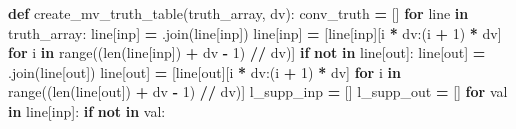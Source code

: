 \documentclass[
  italian,
]{book}
\newenvironment{Shaded}{\begin{snugshade}}{\end{snugshade}}
\newcommand{\BuiltInTok}[1]{#1}
\newcommand{\ControlFlowTok}[1]{\textcolor[rgb]{0.13,0.29,0.53}{\textbf{#1}}}
\newcommand{\DecValTok}[1]{\textcolor[rgb]{0.00,0.00,0.81}{#1}}
\newcommand{\KeywordTok}[1]{\textcolor[rgb]{0.13,0.29,0.53}{\textbf{#1}}}
\newcommand{\NormalTok}[1]{#1}
\newcommand{\OperatorTok}[1]{\textcolor[rgb]{0.81,0.36,0.00}{\textbf{#1}}}
\newcommand{\StringTok}[1]{\textcolor[rgb]{0.31,0.60,0.02}{#1}}
\begin{document}
\begin{Shaded}
\begin{Highlighting}[]
\KeywordTok{def}\NormalTok{ create\_mv\_truth\_table(truth\_array, dv):}
\NormalTok{    conv\_truth }\OperatorTok{=}\NormalTok{ []}
    \ControlFlowTok{for}\NormalTok{ line }\KeywordTok{in}\NormalTok{ truth\_array:}
\NormalTok{        line[}\StringTok{\textquotesingle{}inp\textquotesingle{}}\NormalTok{] }\OperatorTok{=} \StringTok{\textquotesingle{}\textquotesingle{}}\NormalTok{.join(line[}\StringTok{\textquotesingle{}inp\textquotesingle{}}\NormalTok{])}
\NormalTok{        line[}\StringTok{\textquotesingle{}inp\textquotesingle{}}\NormalTok{] }\OperatorTok{=}\NormalTok{ [line[}\StringTok{\textquotesingle{}inp\textquotesingle{}}\NormalTok{][i }\OperatorTok{*}\NormalTok{ dv:(i }\OperatorTok{+} \DecValTok{1}\NormalTok{) }\OperatorTok{*}\NormalTok{ dv]}
            \ControlFlowTok{for}\NormalTok{ i }\KeywordTok{in} \BuiltInTok{range}\NormalTok{((}\BuiltInTok{len}\NormalTok{(line[}\StringTok{\textquotesingle{}inp\textquotesingle{}}\NormalTok{]) }\OperatorTok{+}\NormalTok{ dv }\OperatorTok{{-}} \DecValTok{1}\NormalTok{) }\OperatorTok{//}\NormalTok{ dv)]}
        \ControlFlowTok{if} \StringTok{\textquotesingle{}{-}\textquotesingle{}} \KeywordTok{not} \KeywordTok{in}\NormalTok{ line[}\StringTok{\textquotesingle{}out\textquotesingle{}}\NormalTok{]:}
\NormalTok{            line[}\StringTok{\textquotesingle{}out\textquotesingle{}}\NormalTok{] }\OperatorTok{=} \StringTok{\textquotesingle{}\textquotesingle{}}\NormalTok{.join(line[}\StringTok{\textquotesingle{}out\textquotesingle{}}\NormalTok{])}
\NormalTok{            line[}\StringTok{\textquotesingle{}out\textquotesingle{}}\NormalTok{] }\OperatorTok{=}\NormalTok{ [line[}\StringTok{\textquotesingle{}out\textquotesingle{}}\NormalTok{][i }\OperatorTok{*}\NormalTok{ dv:(i }\OperatorTok{+} \DecValTok{1}\NormalTok{) }\OperatorTok{*}\NormalTok{ dv]}
                \ControlFlowTok{for}\NormalTok{ i }\KeywordTok{in} \BuiltInTok{range}\NormalTok{((}\BuiltInTok{len}\NormalTok{(line[}\StringTok{\textquotesingle{}out\textquotesingle{}}\NormalTok{]) }\OperatorTok{+}\NormalTok{ dv }\OperatorTok{{-}} \DecValTok{1}\NormalTok{) }\OperatorTok{//}\NormalTok{ dv)]}
\NormalTok{            l\_supp\_inp }\OperatorTok{=}\NormalTok{ []}
\NormalTok{            l\_supp\_out }\OperatorTok{=}\NormalTok{ []}
            \ControlFlowTok{for}\NormalTok{ val }\KeywordTok{in}\NormalTok{ line[}\StringTok{\textquotesingle{}inp\textquotesingle{}}\NormalTok{]:}
                \ControlFlowTok{if} \StringTok{\textquotesingle{}{-}\textquotesingle{}} \KeywordTok{not} \KeywordTok{in}\NormalTok{ val:}

\end{Highlighting}
\end{Shaded}
\end{document}
